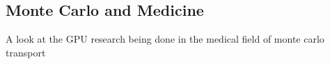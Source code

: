 \subsection{\textbf{Monte Carlo and Medicine}}

A look at the GPU research being done in the medical field of monte carlo transport